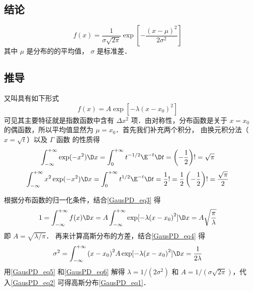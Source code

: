
\subsection{结论}
\begin{equation}\label{GausPD_eq1}
f(x) = \frac{1}{\sigma \sqrt {2\pi } }\exp \left[ { - \frac{{(x - \mu )}^2}{2{\sigma ^2}}} \right]
\end{equation}
其中 $\mu$ 是分布的的平均值， $\sigma$ 是标准差．

\subsection{推导}
又叫具有如下形式
\begin{equation}\label{GausPD_eq2}
f\left( x \right) = A\exp [ - \lambda {(x - {x_0})^2}]
\end{equation}
可见其主要特征就是指数函数中含有 $\Delta x^2$ 项．由对称性，分布函数是关于 $x =x_0$ 的偶函数，所以平均值显然为 $\mu = x_0$．首先我们补充两个积分， 由换元积分法（$x=\sqrt{t}$）以及 $\Gamma$ 函数 的性质得
\begin{equation}\label{GausPD_eq3}
\int_{ - \infty }^{ + \infty } {\exp ( - {x^2})\D x}  = \int_0^{ + \infty } {{t^{ -1/2}}{\E^{ - t}}\D t}  = \left( -\frac 12\right)! = \sqrt \pi 
\end{equation}
\begin{equation}\label{GausPD_eq4}
\int_{ - \infty }^{ + \infty } {{x^2}\exp ( - {x^2})\D x}  = \int_0^{ + \infty } {{t^{1/2}}{\E^{ - t}}\D t}  = \frac{1}{2}! = \frac{1}{2}\left( { - \frac{1}{2}} \right)! = \frac{\sqrt \pi  }{2}
\end{equation}

根据分布函数的归一化条件，结合\autoref{GausPD_eq3} 得
\begin{equation}\label{GausPD_eq5}
1 = \int_{ - \infty }^{ + \infty } {f(x)\D x}  = A\int_{ - \infty }^{ + \infty } {\exp [ - \lambda {{(x - {x_0})}^2}]\D x}  = A\sqrt {\frac{\pi }{\lambda }}
\end{equation}
即 $A = \sqrt {\lambda /\pi }$． 再来计算高斯分布的方差，结合\autoref{GausPD_eq4} 得
\begin{equation}\label{GausPD_eq6}
{\sigma ^2} = \int_{ - \infty }^{ + \infty } {{{(x - {x_0})}^2}A\exp [ - \lambda {{(x - {x_0})}^2}]\D x}  = \frac{1}{2\lambda }
\end{equation}
用\autoref{GausPD_eq5} 和\autoref{GausPD_eq6} 解得 $\lambda = 1/(2\sigma^2)$ 和 $A = 1/(\sigma\sqrt{2\pi})$，代入\autoref{GausPD_eq2} 可得高斯分布\autoref{GausPD_eq1}．